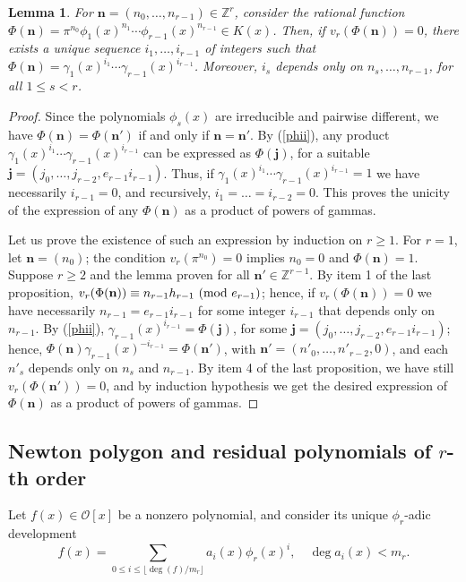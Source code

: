 \documentclass{amsart}
\newtheorem{lemma}[theorem]{Lemma}
\newcommand{\Z}{\mathbb Z}
\def\op{\operatorname}
\def\dg{\op{deg}}
\def\ga{\gamma}
\def\j{\mathbf{j}}
\def\md#1{\ \mbox{\rm(mod }{#1})}
\def\n{\mathbf{n}}
\def\oo{{\mathcal O}}
\def\zpx{\oo[x]}
\begin{document}
\begin{lemma}\label{gammas0}
For $\n=(n_0,\dots,n_{r-1})\in\Z^r$, consider the rational function $\Phi(\n)=\pi^{n_0}\phi_1(x)^{n_1}\cdots\phi_{r-1}(x)^{n_{r-1}}\in K(x)$. Then, if $v_r(\Phi(\n))=0$, there exists a unique sequence $i_1,\dots,i_{r-1}$ of integers such that $\Phi(\n)=\ga_1(x)^{i_1}\cdots \ga_{r-1}(x)^{i_{r-1}}$. Moreover, $i_s$ depends only on $n_s,\dots,n_{r-1}$, for all $1\le s<r$.  
\end{lemma}

\begin{proof}
Since the polynomials $\phi_s(x)$ are irreducible and pairwise different, we have $\Phi(\n)=\Phi(\n')$ if and only if $\n=\n'$.
By (\ref{phii}), any product $\ga_1(x)^{i_1}\cdots \ga_{r-1}(x)^{i_{r-1}}$ can be expressed as $\Phi(\j)$, for a suitable $\j=(j_0,\dots,j_{r-2},e_{r-1}i_{r-1})$. Thus, if $\ga_1(x)^{i_1}\cdots \ga_{r-1}(x)^{i_{r-1}}=1$ we have necessarily $i_{r-1}=0$, and recursively, $i_1=\dots=i_{r-2}=0$. This proves the unicity of the expression of any $\Phi(\n)$ as a product of powers of gammas.

Let us prove the existence of such an expression by induction on $r\ge 1$. For $r=1$, let $\n=(n_0)$; the condition $v_r(\pi^{n_0})=0$ implies
$n_0=0$ and $\Phi(\n)=1$. Suppose $r\ge 2$ and the lemma proven for all $\n'\in\Z^{r-1}$. By item 1 of the last proposition, $v_r(\Phi(\n))\equiv n_{r-1}h_{r-1}\md{e_{r-1}}$; hence, if $v_r(\Phi(\n))=0$ we have necessarily $n_{r-1}=e_{r-1}i_{r-1}$ for some integer $i_{r-1}$ that depends only on $n_{r-1}$. By (\ref{phii}), $\ga_{r-1}(x)^{i_{r-1}}=\Phi(\j)$, for some $\j=(j_0,\dots,j_{r-2},e_{r-1}i_{r-1})$; hence, $\Phi(\n)\ga_{r-1}(x)^{-i_{r-1}}=\Phi(\n')$, with $\n'=(n'_0,\dots,n'_{r-2},0)$, and each $n'_s$ depends only on $n_s$ and $n_{r-1}$. By item 4 of the last proposition, we have still $v_r(\Phi(\n'))=0$, and by induction hypothesis we get the desired expression of $\Phi(\n)$ as a product of powers of gammas.
\end{proof}


\subsection{Newton polygon and residual polynomials of $r$-th order}\label{NPRr}
Let $f(x)\in\zpx$ be a nonzero polynomial, and consider its unique $\phi_r$-adic development
\begin{equation}\label{phiradic}
f(x)=\sum_{0\le i\le \lfloor \dg(f)/m_r\rfloor} a_i(x)\phi_r(x)^i,\quad \dg a_i(x)<m_r.
\end{equation}
\end{document}

